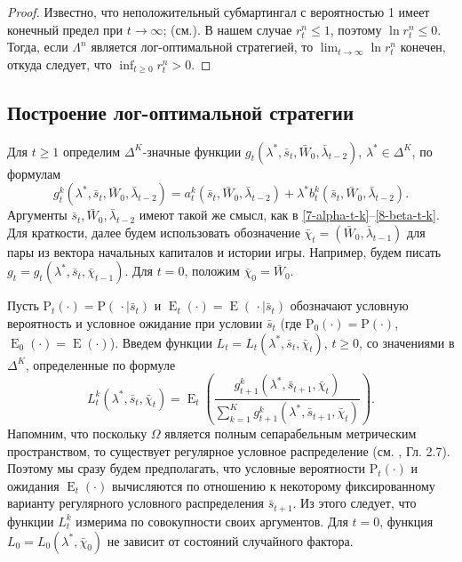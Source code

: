 \documentclass[a4paper,12pt,russian]{article} %
\theoremstyle{definition}
\DeclareMathOperator{\E}{E}
\renewcommand{\P}{\mathrm{P}}
\begin{document}
\begin{proof}
Известно, что неположительный субмартингал с вероятностью 1 имеет конечный предел при $t\to\infty$; (см.\cite[Гл.~7.4]{Shiryaev2019}). В нашем случае $r_t^n \leq 1$, поэтому $\ln r_t^n \leq 0$.
Тогда, если $\Lambda^n$ является лог-оптимальной стратегией, то $\lim_{t\to\infty} \ln r_t^n$ конечен, откуда следует, что $\inf_{t\ge0} r_t^n > 0$. 
\end{proof}


\subsection{Построение лог-оптимальной стратегии}
\label{section3-2-construction-log-optimal}
Для $t\ge 1$ определим $\Delta^K$-значные функции $g_t(\lambda^*,\bar s_t,\bar W_0, \bar\lambda_{t-2})$, $\lambda^*\in \Delta^K$, по формулам 
\[
g_{t}^k(\lambda^*, \bar s_t, \bar W_0,\bar\lambda_{t-2}) 
= a_{t}^k(\bar s_t,\bar W_0,\bar\lambda_{t-2}) + \lambda^* b_{t}^k(\bar s_t,\bar W_0,\bar\lambda_{t-2}).
\]
Аргументы $\bar s_t, \bar W_0,\bar \lambda_{t-2}$ имеют такой же смысл, как в \eqref{7-alpha-t-k}--\eqref{8-beta-t-k}.
Для краткости, далее будем использовать обозначение $\bar \chi_t=(\bar W_0,\bar\lambda_{t-1})$ для пары из вектора начальных капиталов и истории игры.
Например, будем писать $g_t = g_t(\lambda^*,\bar s_t,\bar \chi_{t-1})$.
Для $t=0$, положим $\bar\chi_0 = \bar W_0$. 

Пусть $\P_t(\cdot) = \P(\,\cdot\mid \bar s_t)$ и $\E_t(\cdot) = \E(\,\cdot\mid \bar s_t)$ обозначают условную вероятность и условное ожидание при условии $\bar s_t$ (где $\P_0(\cdot) = \P(\cdot)$, $\E_0(\cdot) = \E(\cdot)$).
Введем функции $L_t = L_t(\lambda^*, \bar s_t, \bar\chi_t)$, $t\ge0$, со значениями в $\Delta^K$,
определенные по формуле
\[
L_{t}^k(\lambda^*, \bar s_t,\bar\chi_t) 
= \E_t\left(
  \frac{g_{t+1}^k(\lambda^*,\bar s_{t+1},\bar\chi_t)}
       {\sum_{k=1}^K g_{t+1}^k(\lambda^*,\bar s_{t+1},\bar\chi_t)} 
  \right).
\]
Напомним, что поскольку $\Omega$ является полным сепарабельным метрическим пространством, то существует регулярное условное распределение (см. \cite{Shiryaev2019}, Гл. 2.7).
Поэтому мы сразу будем предполагать, что условные вероятности $\P_t(\cdot)$ и ожидания $\E_t(\cdot)$ вычисляются по отношению к некоторому фиксированному варианту регулярного условного распределения $\bar s_{t+1}$. Из этого следует, что функции $L_{t}^k$ измерима по совокупности своих аргументов. 
Для $t=0$, функция $L_0 = L_0(\lambda^*,\bar\chi_0)$ не зависит от состояний случайного фактора. 
\end{document}
